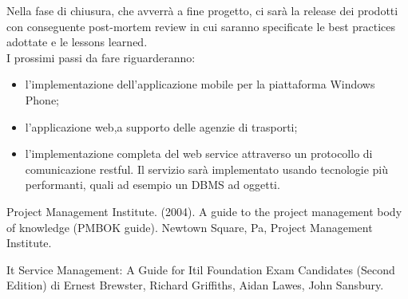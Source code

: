 \documentclass[conference]{IEEEtran}
\begin{document}
Nella fase di chiusura, che avverr\`{a} a fine progetto, ci sar\`{a} la release dei prodotti con conseguente post-mortem review in cui saranno specificate le best practices adottate e le lessons learned.\\
I prossimi passi da fare riguarderanno:
\begin{itemize}
\item l\rq implementazione dell\rq applicazione mobile per la piattaforma Windows Phone;
\item l\rq applicazione web,a supporto delle agenzie di trasporti;
\item l\rq implementazione completa del web service attraverso un protocollo di comunicazione restful. Il servizio sar\`{a} implementato usando tecnologie pi\`{u} performanti, quali ad esempio un DBMS ad oggetti.
\end{itemize}
\begin{thebibliography}{1}

Project Management Institute. (2004). A guide to the project management body of knowledge (PMBOK guide). Newtown Square, Pa, Project Management Institute.

It Service Management: A Guide for Itil Foundation Exam Candidates (Second Edition) di Ernest Brewster, Richard Griffiths, Aidan Lawes, John Sansbury.


\end{thebibliography}




\end{document}
